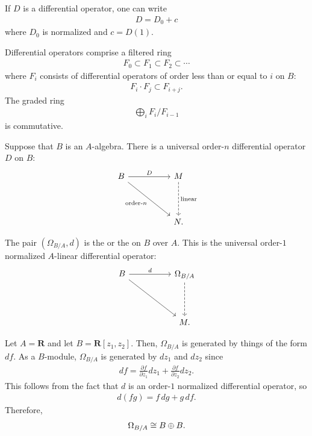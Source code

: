 \documentclass [11 pt, oneside] {article}
\begin{document}
If $D$ is a differential operator, one can write
\begin{align*}
	D = D_0+c
\end{align*}
where $D_0$ is normalized and $c=D(1)$.

Differential operators comprise a filtered ring
\begin{align*}
	F_0\subset F_1\subset F_2\subset\cdots
\end{align*}
where $F_i$ consists of differential operators of order less than or equal to $i$ on $B$:
\begin{align*}
	F_i\cdot F_j\subset F_{i+j}.
\end{align*}
The graded ring
\begin{align*}
	\bigoplus_{i}F_i/F_{i-1}
\end{align*}
is commutative.

Suppose that $B$ is an $A$-algebra. There is a universal order-$n$ differential operator $D$ on $B$:
\[
\begin{tikzcd}[row sep = 4 em, column sep = 5 em]
	B\ar[r,"D"] \ar[dr, "\textrm{order-$n$}", swap]& M\ar[d,dashed,"\textrm{linear}"] \\
						  & N.
\end{tikzcd}
\]

The pair $(\Omega_{B/A}, d)$ is the  or the  on $B$ over $A$. This is the universal order-$1$ normalized $A$-linear differential operator:
\[
\begin{tikzcd}[row sep = 4 em, column sep = 5 em]
	B\ar[dr]\ar[r,"d"] & \Omega_{B/A}\ar[d,dashed]\\
			   & M.
\end{tikzcd}
\]
\begin{example}[ ]\label{}\text{}
Let $A=\mathbf{R}$ and let $B=\mathbf{R}[z_1,z_2]$. Then, $\Omega_{B/A}$ is generated by things of the form $df$. As a $B$-module, $\Omega_{B/A}$ is generated by $dz_1$ and $dz_2$ since
\begin{align*}
	df = \frac{\partial f}{\partial z_1}dz_1 + \frac{\partial f}{\partial z_2}dz_2.
\end{align*}
This follows from the fact that $d$ is an order-$1$ normalized differential operator, so
\begin{align*}
	d(fg) = f\,{dg} + g\, {df}.
\end{align*}
Therefore,
\begin{align*}
	\Omega_{B/A} \cong B\oplus B.
\end{align*}
\end{example}
\end{document}

